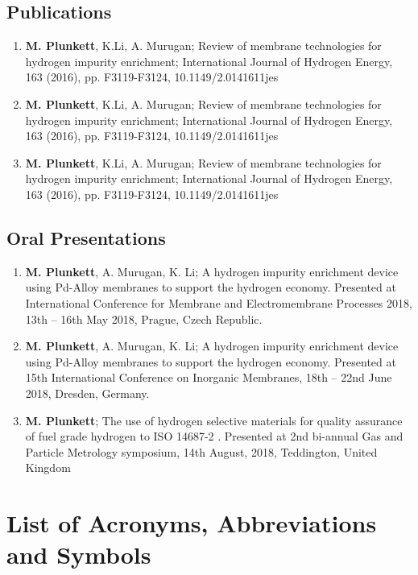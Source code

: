 \documentclass[a4paper,12pt]{report}
\begin{document}
\section*{Publications}
\begin{enumerate}
    \item \textbf{M. Plunkett}, K.Li, A. Murugan; Review of membrane technologies for hydrogen impurity enrichment; International Journal of Hydrogen Energy, 163 (2016), pp. F3119-F3124, 10.1149/2.0141611jes
    \item \textbf{M. Plunkett}, K.Li, A. Murugan; Review of membrane technologies for hydrogen impurity enrichment; International Journal of Hydrogen Energy, 163 (2016), pp. F3119-F3124, 10.1149/2.0141611jes
    \item \textbf{M. Plunkett}, K.Li, A. Murugan; Review of membrane technologies for hydrogen impurity enrichment; International Journal of Hydrogen Energy, 163 (2016), pp. F3119-F3124, 10.1149/2.0141611jes

\end{enumerate}

\section*{Oral Presentations}
\begin{enumerate}
    \item \textbf{M. Plunkett}, A. Murugan, K. Li; A hydrogen impurity enrichment device using Pd-Alloy membranes to support the hydrogen economy. Presented at International Conference for Membrane and Electromembrane Processes 2018, 13th – 16th May 2018, Prague, Czech Republic.
    \item \textbf{M. Plunkett}, A. Murugan, K. Li; A hydrogen impurity enrichment device using Pd-Alloy membranes to support the hydrogen economy. Presented at 15th International Conference on Inorganic Membranes, 18th – 22nd June 2018, Dresden, Germany. 
    \item \textbf{M. Plunkett}; The use of hydrogen selective materials for quality assurance of fuel grade hydrogen to ISO 14687-2 . Presented at 2nd bi-annual Gas and Particle Metrology symposium, 14th August, 2018, Teddington, United Kingdom 
\end{enumerate}

\listoffigures
\listoftables

\chapter*{List of Acronyms, Abbreviations and Symbols}


\tableofcontents















\end{document}

